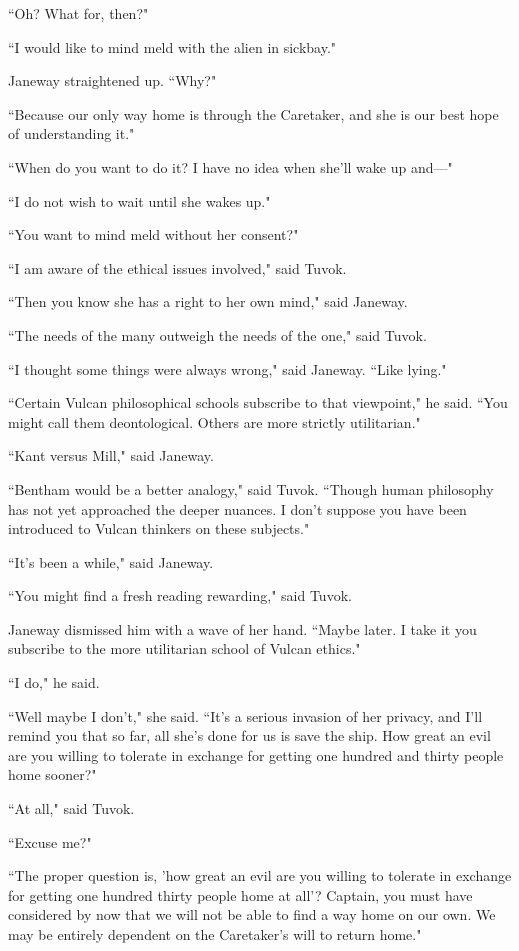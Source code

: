 \documentclass[twoside,letterpaper,12pt]{memoir}
\begin{document}
``Oh? What for, then?" 

``I would like to mind meld with the alien in sickbay." 

Janeway straightened up. ``Why?" 

``Because our only way home is through the Caretaker, and she is our best hope of understanding it." 

``When do you want to do it? I have no idea when she'll wake up and---" 

``I do not wish to wait until she wakes up." 

``You want to mind meld without her consent?" 

``I am aware of the ethical issues involved," said Tuvok. 

``Then you know she has a right to her own mind," said Janeway. 

``The needs of the many outweigh the needs of the one," said Tuvok. 

``I thought some things were always wrong," said Janeway. ``Like lying." 

``Certain Vulcan philosophical schools subscribe to that viewpoint," he said. ``You might call them deontological. Others are more strictly utilitarian." 

``Kant versus Mill," said Janeway. 

``Bentham would be a better analogy," said Tuvok. ``Though human philosophy has not yet approached the deeper nuances. I don't suppose you have been introduced to Vulcan thinkers on these subjects." 

``It's been a while," said Janeway. 

``You might find a fresh reading rewarding," said Tuvok. 

Janeway dismissed him with a wave of her hand. ``Maybe later. I take it you subscribe to the more utilitarian school of Vulcan ethics." 

``I do," he said. 

``Well maybe I don't," she said. ``It's a serious invasion of her privacy, and I'll remind you that so far, all she's done for us is save the ship. How great an evil are you willing to tolerate in exchange for getting one hundred and thirty people home sooner?" 

``At all," said Tuvok. 

``Excuse me?" 

``The proper question is, 'how great an evil are you willing to tolerate in exchange for getting one hundred thirty people home at all'? Captain, you must have considered by now that we will not be able to find a way home on our own. We may be entirely dependent on the Caretaker's will to return home." 
\end{document}
